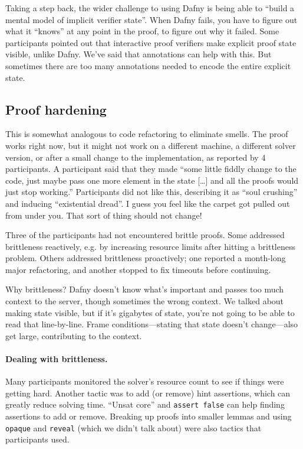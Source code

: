 \documentclass[11pt]{article}
\begin{document}
Taking a step back, the wider challenge to using Dafny is being able
to ``build a mental model of implicit verifier state''. When Dafny
fails, you have to figure out what it ``knows'' at any point in the
proof, to figure out why it failed. Some participants pointed out that
interactive proof verifiers make explicit proof state visible, unlike
Dafny.  We've said that annotations can help with this. But sometimes
there are too many annotations needed to encode the entire explicit state.

\subsection*{Proof hardening}
This is somewhat analogous to code refactoring to eliminate smells.
The proof works right now, but it might not work on a different machine,
a different solver version, or after a small change to the implementation, as
reported by 4 participants.
A participant said that they made ``some little fiddly change to the code,
just maybe pass one more element in the state [\ldots] and all the proofs
would just stop working.'' Participants did not like this, describing it as
``soul crushing'' and inducing ``existential dread''. I guess you feel like
the carpet got pulled out from under you. That sort of thing should not change!

Three of the participants had not encountered brittle proofs. Some
addressed brittleness reactively, e.g. by increasing resource
limits after hitting a brittleness problem. Others addressed brittleness proactively; one reported a
month-long major refactoring, and another stopped to fix timeouts
before continuing.

Why brittleness? Dafny doesn't know what's important and passes too much context
to the server, though sometimes the wrong context. We talked about making state
visible, but if it's gigabytes of state, you're not going to be able to read that
line-by-line. Frame conditions---stating that state doesn't change---also get large,
contributing to the context.

\paragraph{Dealing with brittleness.} Many participants monitored the solver's resource
count to see if things were getting hard. Another tactic was to add (or remove)
hint assertions, which can greatly reduce solving time. ``Unsat core'' and \texttt{assert false}
can help finding assertions to add or remove. Breaking up proofs into smaller lemmas and using
\texttt{opaque} and \texttt{reveal} (which we didn't talk about) were also tactics that participants used.
\end{document}
